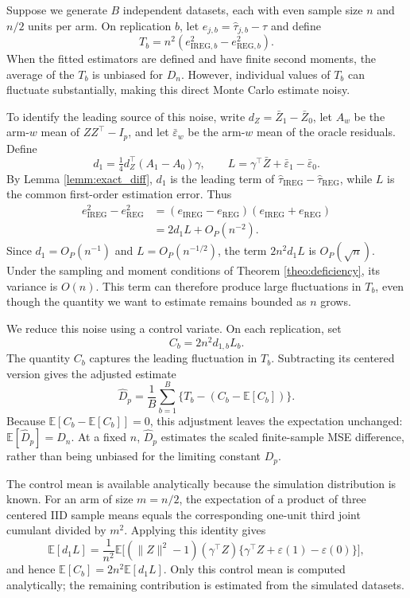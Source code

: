 \documentclass{article}
\newcommand{\EEE}{\mathbb{E}}
\newcommand{\htau}{\hat{\tau}}
\newcommand{\IREG}{\mathrm{IREG}}
\newcommand{\REG}{\mathrm{REG}}
\theoremstyle{plain}
\theoremstyle{definition}
\theoremstyle{remark}
\begin{document}
Suppose we generate $B$ independent datasets, each with even sample
size $n$ and $n/2$ units per arm. On replication $b$, let
$e_{j,b}=\htau_{j,b}-\tau$ and define
\[
T_b=n^2(e_{\IREG,b}^2-e_{\REG,b}^2).
\]
When the fitted estimators are defined and have finite second moments,
the average of the $T_b$ is unbiased for $D_n$. However, individual
values of $T_b$ can fluctuate substantially, making this direct
Monte Carlo estimate noisy.

To identify the leading source of this noise, write
$d_Z=\bar Z_1-\bar Z_0$, let $A_w$ be the arm-$w$ mean of
$ZZ^\top-I_p$, and let $\bar\varepsilon_w$ be the arm-$w$ mean
of the oracle residuals. Define
\[
d_1=\tfrac14d_Z^\top(A_1-A_0)\gamma,
\qquad
L=\gamma^\top\bar Z+\bar\varepsilon_1-\bar\varepsilon_0.
\]
By Lemma \ref{lemm:exact_diff}, $d_1$ is the leading term of
$\htau_\IREG-\htau_\REG$, while $L$ is the common first-order
estimation error. Thus
\[
\begin{aligned}
e_\IREG^2-e_\REG^2
&=(e_\IREG-e_\REG)(e_\IREG+e_\REG)\\
&=2d_1L+O_P(n^{-2}).
\end{aligned}
\]
Since $d_1=O_P(n^{-1})$ and $L=O_P(n^{-1/2})$, the term
$2n^2d_1L$ is $O_P(\sqrt n)$. Under the sampling and moment conditions of Theorem \ref{theo:deficiency}, its variance is $O(n)$. This term can therefore
produce large fluctuations in $T_b$, even though the quantity we
want to estimate remains bounded as $n$ grows.

We reduce this noise using a control variate. On each replication,
set
\[
C_b=2n^2d_{1,b}L_b.
\]
The quantity $C_b$ captures the leading fluctuation in $T_b$.
Subtracting its centered version gives the adjusted estimate
\[
\hat D_p
=
\frac1B\sum_{b=1}^B
\big\{T_b-(C_b-\EEE[C_b])\big\}.
\]
Because $\EEE[C_b-\EEE[C_b]]=0$, this adjustment leaves the
expectation unchanged: $\EEE[\hat D_p]=D_n$. At a fixed $n$,
$\hat D_p$ estimates the scaled finite-sample MSE difference,
rather than being unbiased for the limiting constant $D_p$.

The control mean is available analytically because the simulation
distribution is known. For an arm of size $m=n/2$, the expectation
of a product of three centered IID sample means equals the
corresponding one-unit third joint cumulant divided by $m^2$.
Applying this identity gives
\begin{equation}
\label{eq:cv_identity}
\EEE[d_1L]
=
\frac{1}{n^2}
\EEE\Big[
(\|Z\|^2-1)(\gamma^\top Z)
\{\gamma^\top Z+\varepsilon(1)-\varepsilon(0)\}
\Big],
\end{equation}
and hence $\EEE[C_b]=2n^2\EEE[d_1L]$. Only this control mean is
computed analytically; the remaining contribution is estimated
from the simulated datasets.
\end{document}
